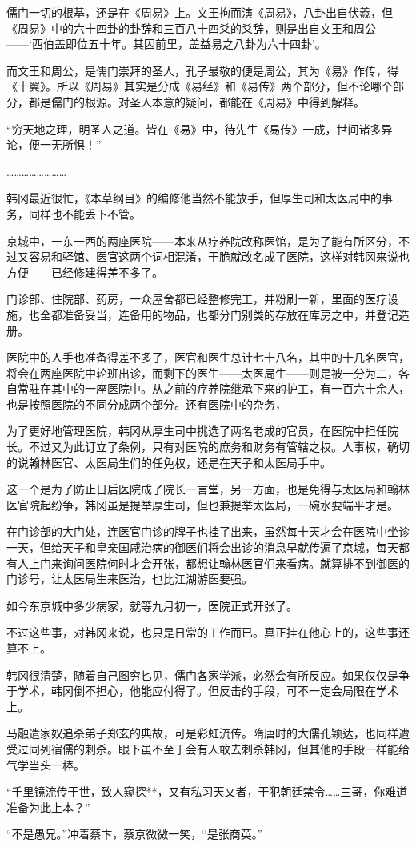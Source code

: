 儒门一切的根基，还是在《周易》上。文王拘而演《周易》，八卦出自伏羲，但《周易》中的六十四卦的卦辞和三百八十四爻的爻辞，则是出自文王和周公——‘西伯盖即位五十年。其囚前里，盖益易之八卦为六十四卦’。

而文王和周公，是儒门崇拜的圣人，孔子最敬的便是周公，其为《易》作传，得《十翼》。所以《周易》其实是分成《易经》和《易传》两个部分，但不论哪个部分，都是儒门的根源。对圣人本意的疑问，都能在《周易》中得到解释。

“穷天地之理，明圣人之道。皆在《易》中，待先生《易传》一成，世间诸多异论，便一无所惧！”

……………………

韩冈最近很忙，《本草纲目》的编修他当然不能放手，但厚生司和太医局中的事务，同样也不能丢下不管。

京城中，一东一西的两座医院——本来从疗养院改称医馆，是为了能有所区分，不过又容易和驿馆、医官这两个词相混淆，干脆就改名成了医院，这样对韩冈来说也方便——已经修建得差不多了。

门诊部、住院部、药房，一众屋舍都已经整修完工，并粉刷一新，里面的医疗设施，也全都准备妥当，连备用的物品，也都分门别类的存放在库房之中，并登记造册。

医院中的人手也准备得差不多了，医官和医生总计七十八名，其中的十几名医官，将会在两座医院中轮班出诊，而剩下的医生——太医局生——则是被一分为二，各自常驻在其中的一座医院中。从之前的疗养院继承下来的护工，有一百六十余人，也是按照医院的不同分成两个部分。还有医院中的杂务，

为了更好地管理医院，韩冈从厚生司中挑选了两名老成的官员，在医院中担任院长。不过又为此订立了条例，只有对医院的庶务和财务有管辖之权。人事权，确切的说翰林医官、太医局生们的任免权，还是在天子和太医局手中。

这一个是为了防止日后医院成了院长一言堂，另一方面，也是免得与太医局和翰林医官院起纷争，韩冈虽是提举厚生司，但也兼提举太医局，一碗水要端平才是。

在门诊部的大门处，连医官门诊的牌子也挂了出来，虽然每十天才会在医院中坐诊一天，但给天子和皇亲国戚治病的御医们将会出诊的消息早就传遍了京城，每天都有人上门来询问医院何时才会开张，都想让翰林医官们来看病。就算排不到御医的门诊号，让太医局生来医治，也比江湖游医要强。

如今东京城中多少病家，就等九月初一，医院正式开张了。

不过这些事，对韩冈来说，也只是日常的工作而已。真正挂在他心上的，这些事还算不上。

韩冈很清楚，随着自己图穷匕见，儒门各家学派，必然会有所反应。如果仅仅是争于学术，韩冈倒不担心，他能应付得了。但反击的手段，可不一定会局限在学术上。

马融遣家奴追杀弟子郑玄的典故，可是彩虹流传。隋唐时的大儒孔颖达，也同样遭受过同列宿儒的刺杀。眼下虽不至于会有人敢去刺杀韩冈，但其他的手段一样能给气学当头一棒。

“千里镜流传于世，致人窥探**，又有私习天文者，干犯朝廷禁令……三哥，你难道准备为此上本？”

“不是愚兄。”冲着蔡卞，蔡京微微一笑，“是张商英。”

